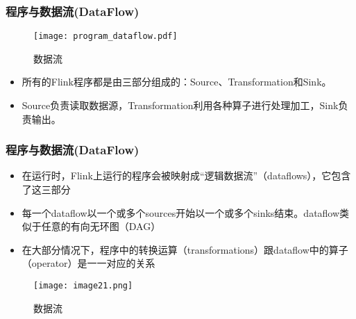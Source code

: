 \documentclass{beamer}
\begin{document}
  \begin{frame}
      \frametitle{程序与数据流(DataFlow)}
  
      \begin{figure}
          \centering
          \texttt{[image: program\_dataflow.pdf]}
          \caption{数据流}
      \end{figure}

      \begin{itemize}
          \item 所有的Flink程序都是由三部分组成的：Source、Transformation和Sink。
          \item Source负责读取数据源，Transformation利用各种算子进行处理加工，Sink负责输出。
      \end{itemize}
  
  \end{frame}

  \begin{frame}
      \frametitle{程序与数据流(DataFlow)}

      \begin{itemize}
          \item 在运行时，Flink上运行的程序会被映射成“逻辑数据流”（dataflows），它包含了这三部分
          \item 每一个dataflow以一个或多个sources开始以一个或多个sinks结束。dataflow类似于任意的有向无环图（DAG）
          \item 在大部分情况下，程序中的转换运算（transformations）跟dataflow中的算子（operator）是一一对应的关系
      \end{itemize}

      \begin{figure}
          \centering
          \texttt{[image: image21.png]}
          \caption{数据流}
      \end{figure}
  
  \end{frame}
\end{document}
